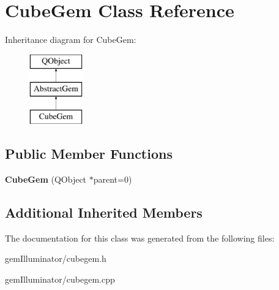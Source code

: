 \hypertarget{class_cube_gem}{}\section{Cube\+Gem Class Reference}
\label{class_cube_gem}
Inheritance diagram for Cube\+Gem\+:\begin{figure}[H]
\begin{center}
\leavevmode
\includegraphics[height=3.000000cm]{class_cube_gem}
\end{center}
\end{figure}
\subsection*{Public Member Functions}
\begin{DoxyCompactItemize}
\item 
\hypertarget{class_cube_gem_a049ed1f21d75e2876cbbc69c56db93c2}{}{\bfseries Cube\+Gem} (Q\+Object $\ast$parent=0)\label{class_cube_gem_a049ed1f21d75e2876cbbc69c56db93c2}

\end{DoxyCompactItemize}
\subsection*{Additional Inherited Members}


The documentation for this class was generated from the following files\+:\begin{DoxyCompactItemize}
\item 
gem\+Illuminator/cubegem.\+h\item 
gem\+Illuminator/cubegem.\+cpp\end{DoxyCompactItemize}
